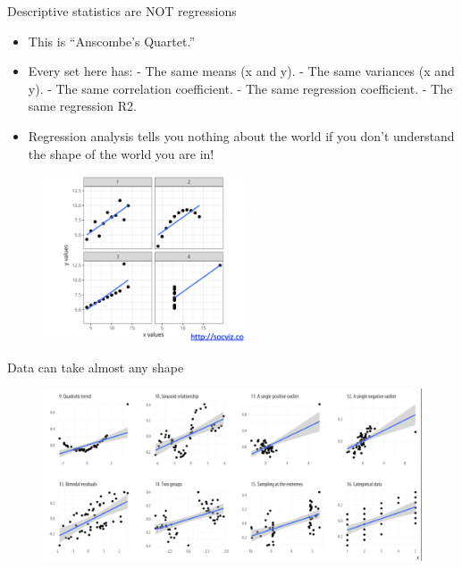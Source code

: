 \documentclass[aspectratio=169]{beamer}
\begin{document}
\begin{frame}{Descriptive statistics are NOT regressions}
	\begin{multicols}{2}	
		
		\begin{itemize}[<default overlay specification>]
			\item<1> This is “Anscombe’s Quartet.”
			\item<1> Every set here has:
					\newline - The same means (x and y).
					\newline - The same variances (x and y). 
					\newline - The same correlation coefficient.
					\newline - The same regression coefficient.
					\newline - The same regression R2.
			\item<1> Regression analysis tells you nothing about the world if you don’t understand the shape of the world you are in!
		\end{itemize}
		
		\begin{figure}
			\centering
			\includegraphics[width=60mm]{img/Regressions}
		\end{figure}
		
	\end{multicols}
\end{frame}


\begin{frame}{Data can take almost any shape}
	
\begin{figure}
	\centering
	\includegraphics[width=\linewidth]{img/Shape}
\end{figure}

\end{frame}
\end{document}
